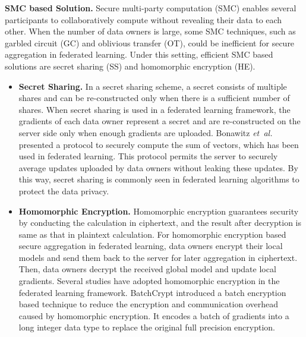 \documentclass[11pt]{article}
\newcommand{\etal}{\textit{et~al.}\xspace}
\newcommand{\fakeparagraph}[1]{\vspace{1mm}\noindent\textbf{#1.}}
\begin{document}
\fakeparagraph{SMC based Solution}
Secure multi-party computation (SMC) enables several participants to collaboratively compute without revealing their data to each other.
When the number of data owners is large, some SMC techniques, such as garbled circuit (GC) and oblivious transfer (OT), could be inefficient for secure aggregation in federated learning.
Under this setting, efficient SMC based solutions are secret sharing (SS) and homomorphic encryption (HE).
\begin{itemize}
    \item \textbf{Secret Sharing.}
    In a secret sharing scheme, a secret consists of multiple shares and can be re-constructed only when there is a sufficient number of shares.
    When secret sharing is used in a federated learning framework, the gradients of each data owner represent a secret and are re-constructed on the server side only when enough gradients are uploaded.
    Bonawitz \etal \cite{Yongxin-DBLP:conf/ccs/BonawitzIKMMPRS17} presented a protocol to securely compute the sum of vectors, which has been used in federated learning.
	This protocol permits the server to securely average updates uploaded by data owners without leaking these updates.
    By this way, secret sharing is commonly seen in federated learning algorithms \cite{Yongxin-DBLP:conf/icics/DongCSW19, Yongxin-DBLP:journals/tifs/XuLL0L20, Yongxin-DBLP:conf/bigdataconf/SharmaXLK19} to protect the data privacy.
	
    \item \textbf{Homomorphic Encryption.}
    Homomorphic encryption guarantees security by conducting the calculation in ciphertext, and the result after decryption is same as that in plaintext calculation.
	For homomorphic encryption based secure aggregation in federated learning, data owners encrypt their local models and send them back to the server for later aggregation in ciphertext. Then, data owners decrypt the received global model and update local gradients.
    Several studies \cite{Yongxin-DBLP:journals/tifs/PhongAHWM18, Yongxin-DBLP:conf/globecom/ZhangCYD19, Yongxin-DBLP:journals/expert/ChenQWYG20, Yongxin-zhangtkde23} have adopted homomorphic encryption in the federated learning framework.
    \textsf{BatchCrypt} \cite{Yongxin-DBLP:conf/usenix/ZhangLX00020} introduced a batch encryption based technique to reduce the encryption and communication overhead caused by homomorphic encryption. It encodes a batch of gradients into a long integer data type to replace the original full precision encryption.
\end{itemize}
\end{document}
